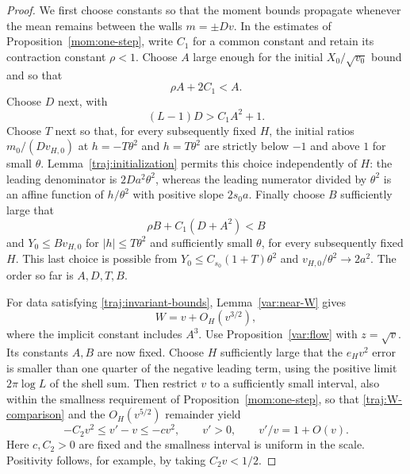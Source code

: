 \begin{proof}
We first choose constants so that the moment bounds propagate whenever
the mean remains between the walls $m=\pm Dv$.  In the estimates of
Proposition~\ref{mom:one-step}, write $C_1$ for a common constant
and retain its contraction constant $\rho<1$.  Choose $A$ large
enough for the initial $X_0/\sqrt{v_0}$ bound and so that
\begin{equation}
 \rho A+2C_1< A.
 \label{traj:A-choice}
\end{equation}
Choose $D$ next, with
\begin{equation}
 (L-1)D>C_1A^2+1.
 \label{traj:D-choice}
\end{equation}
Choose $T$ next so that, for every subsequently fixed $H$, the initial
ratios $m_0/(Dv_{H,0})$ at $h=-T\theta^2$ and $h=T\theta^2$ are
strictly below $-1$ and above $1$ for small $\theta$.
Lemma~\ref{traj:initialization} permits this choice independently
of $H$: the leading denominator is $2Da^2\theta^2$, whereas the
leading numerator divided by $\theta^2$ is an affine function of
$h/\theta^2$ with positive slope $2s_0a$.
Finally choose $B$ sufficiently large that
\begin{equation}
 \rho B+C_1(D+A^2)<B
 \label{traj:B-choice}
\end{equation}
and $Y_0\le Bv_{H,0}$ for $|h|\le T\theta^2$ and sufficiently small
$\theta$, for every subsequently fixed $H$.  This last choice is
possible from $Y_0\le C_{s_0}(1+T)\theta^2$ and
$v_{H,0}/\theta^2\to2a^2$.  The order so far is $A,D,T,B$.

For data satisfying \eqref{traj:invariant-bounds},
Lemma~\ref{var:near-W} gives
\begin{equation}
 W=v+O_H(v^{3/2}),
 \label{traj:W-comparison}
\end{equation}
where the implicit constant includes $A^3$.  Use
Proposition~\ref{var:flow} with $z=\sqrt v$.  Its constants $A,B$
are now fixed.  Choose $H$ sufficiently large that the $e_Hv^2$
error is smaller than one quarter of the negative leading term, using
the positive limit $2\pi\log L$ of the shell sum.  Then restrict $v$
to a sufficiently small interval, also within the smallness requirement
of Proposition~\ref{mom:one-step}, so that
\eqref{traj:W-comparison} and the $O_H(v^{5/2})$ remainder yield
\begin{equation}
 -C_2v^2\le v'-v\le-cv^2,
 \qquad v'>0,
 \qquad v'/v=1+O(v).
 \label{traj:scalar-recursion}
\end{equation}
Here $c,C_2>0$ are fixed and the smallness interval is uniform in
the scale.  Positivity follows, for example, by taking $C_2v<1/2$.


\end{proof}
